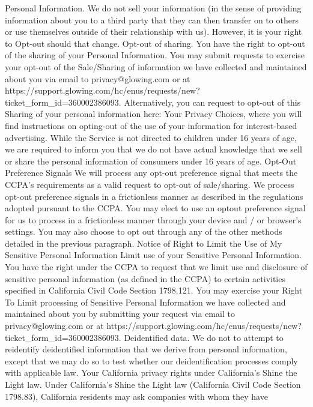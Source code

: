 Personal Information. We do not sell your information (in the sense
of providing information about you to a third party that they can
then transfer on to others or use themselves outside of their
relationship with us). However, it is your right to Opt-out should
that change.
Opt-out of sharing. You have the right to opt-out of the sharing of
your Personal Information.
You may submit requests to exercise your opt-out of the Sale/Sharing of
information we have collected and maintained about you via email
to privacy@glowing.com or at https://support.glowing.com/hc/enus/requests/new?ticket_form_id=360002386093. Alternatively, you can
request to opt-out of this Sharing of your personal information here: Your
Privacy Choices, where you will find instructions on opting-out of the use
of your information for interest-based advertising.
While the Service is not directed to children under 16 years of age, we
are required to inform you that we do not have actual knowledge that we
sell or share the personal information of consumers under 16 years of
age.
Opt-Out Preference Signals
We will process any opt-out preference signal that meets the CCPA’s
requirements as a valid request to opt-out of sale/sharing. We process
opt-out preference signals in a frictionless manner as described in the
regulations adopted pursuant to the CCPA. You may elect to use an optout preference signal for us to process in a frictionless manner through
your device and / or browser’s settings. You may also choose to opt out
through any of the other methods detailed in the previous paragraph.
Notice of Right to Limit the Use of My Sensitive Personal
Information
Limit use of your Sensitive Personal Information. You have the right
under the CCPA to request that we limit use and disclosure of sensitive
personal information (as defined in the CCPA) to certain activities
specified in California Civil Code Section 1798.121. You may exercise
your Right To Limit processing of Sensitive Personal Information we
have collected and maintained about you by submitting your request via
email to privacy@glowing.com or at https://support.glowing.com/hc/enus/requests/new?ticket_form_id=360002386093.
Deidentified data. We do not to attempt to reidentify deidentified
information that we derive from personal information, except that we
may do so to test whether our deidentification processes comply with
applicable law.
Your California privacy rights under California’s Shine the Light
law. Under California’s Shine the Light law (California Civil Code Section
1798.83), California residents may ask companies with whom they have

